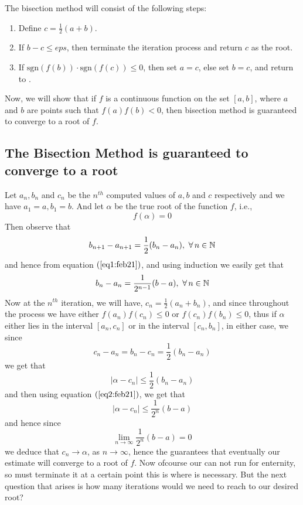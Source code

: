 The bisection method will consist of the following steps: 

\begin{theoremBox}
    \begin{enumerate}
        \item[] Define $c = \frac{1}{2}(a+b)$.
        \item[] If $b - c \leq eps$, then terminate the iteration process and return $c$ as the root.
        \item[] If $\mbox{sgn}(f(b)) \cdot \mbox{sgn}(f(c)) \leq 0$, then set $a = c$, else set $b = c$, and return to .    
    \end{enumerate}
\end{theoremBox}

Now, we will show that if $f$ is a continuous function on the set $[a,b]$, where $a$ and $b$ are points such that $f(a)f(b) < 0$, then bisection method is guaranteed to converge to a root of $f$. 

\subsection{The Bisection Method is guaranteed to converge to a root}

Let $a_n, b_n$ and $c_n$ be the $n^{th}$ computed values of $a,b$ and $c$ respectively and we have $a_1 = a, b_1 = b$. And let $\alpha$ be the true root of the function $f$, i.e., 
\[
    f(\alpha) = 0  
\]
Then observe that 
\begin{equation}\label{eq1:feb21}
    b_{n+1} - a_{n+1} = \frac{1}{2} (b_n - a_n), \ \forall \, n \in \mathbb{N}
\end{equation}
and hence from equation $(\ref{eq1:feb21})$, and using induction we easily get that 
\begin{equation}\label{eq2:feb21}
    b_n - a_n = \frac{1}{2^{n-1}} (b-a), \ \forall \, n \in \mathbb{N}
\end{equation} 
Now at the $n^{th}$ iteration, we will have, $c_n = \frac{1}{2}(a_n+b_n)$, and since throughout the process we have either $f(a_n) f(c_n) \leq 0$ or $f(c_n) f(b_n) \leq 0$, thus if $\alpha$ either lies in the interval $[a_n, c_n]$ or in the interval $[c_n,b_n]$, in either case, we since 
\[
    c_n - a_n = b_n - c_n = \frac{1}{2}(b_n - a_n)  
\]
we get that 
\begin{equation*}
    |\alpha - c_n| \leq \frac{1}{2} (b_n - a_n)
\end{equation*}
and then using equation $(\ref{eq2:feb21})$, we get that 
\begin{equation}\label{eq3:feb21}
    |\alpha - c_n| \leq \frac{1}{2^n} (b-a)
\end{equation}
and hence since \[\lim_{n \to \infty} \frac{1}{2^n}(b-a) = 0\] we deduce that $c_n \to \alpha$, as $n \to \infty$, hence the  guarantees that eventually our estimate will converge to a root of $f$. Now ofcourse our can not run for enternity, so must terminate it at a certain point this is where  is necessary. But the next question that arises is how many iterations would we need to reach to our desired root? 

